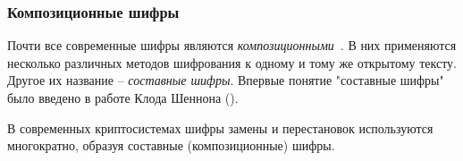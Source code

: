 \subsubsection{Композиционные шифры}

Почти все современные шифры являются \emph{композиционными}~\cite{AlZKCh:2001}. В них применяются несколько различных методов шифрования к одному и тому же открытому тексту. Другое их название -- \emph{составные шифры}. Впервые понятие "составные шифры" было введено в работе Клода Шеннона ().

В современных криптосистемах шифры замены и перестановок используются многократно, образуя составные (композиционные) шифры.

